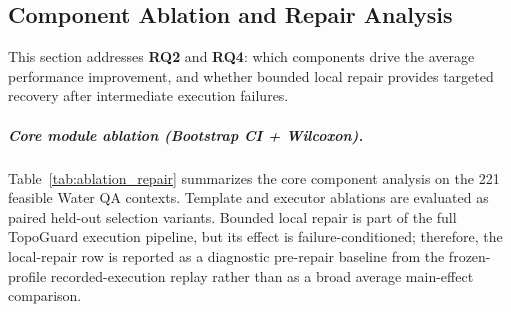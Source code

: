 \documentclass[acmsmall,review,anonymous]{acmart}
\begin{document}
\begin{table}[t]
\centering
\caption{Auxiliary transfer results on Storm Surge. The noise-perturbed contexts provide supporting evidence rather than full-scale cross-domain validation.}
\label{tab:storm_transfer}
\end{table}


\subsection{Component Ablation and Repair Analysis}
\label{subsec:ablation_repair}

This section addresses \textbf{RQ2} and \textbf{RQ4}: which components drive the average performance improvement, and whether bounded local repair provides targeted recovery after intermediate execution failures.

\subparagraph{Core module ablation (Bootstrap CI + Wilcoxon).}
Table~\ref{tab:ablation_repair} summarizes the core component analysis on the 221 feasible Water QA contexts. Template and executor ablations are evaluated as paired held-out selection variants. Bounded local repair is part of the full TopoGuard execution pipeline, but its effect is failure-conditioned; therefore, the local-repair row is reported as a diagnostic pre-repair baseline from the frozen-profile recorded-execution replay rather than as a broad average main-effect comparison.
\end{document}
